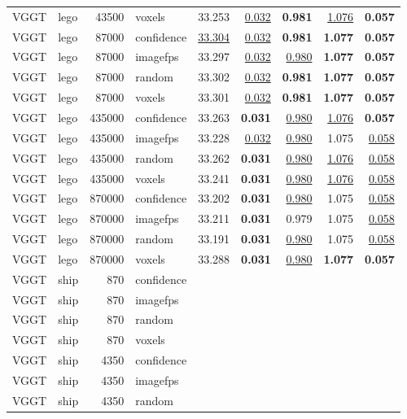 \begin{table}[H]
\begin{tabular}{llrlrrrrr}
VGGT & lego & 43500 & voxels & 33.253 & \underline{0.032} & \textbf{0.981} & \underline{1.076} & \textbf{0.057} \\
VGGT & lego & 87000 & confidence & \underline{33.304} & \underline{0.032} & \textbf{0.981} & \textbf{1.077} & \textbf{0.057} \\
VGGT & lego & 87000 & imagefps & 33.297 & \underline{0.032} & \underline{0.980} & \textbf{1.077} & \textbf{0.057} \\
VGGT & lego & 87000 & random & 33.302 & \underline{0.032} & \textbf{0.981} & \textbf{1.077} & \textbf{0.057} \\
VGGT & lego & 87000 & voxels & 33.301 & \underline{0.032} & \textbf{0.981} & \textbf{1.077} & \textbf{0.057} \\
VGGT & lego & 435000 & confidence & 33.263 & \textbf{0.031} & \underline{0.980} & \underline{1.076} & \textbf{0.057} \\
VGGT & lego & 435000 & imagefps & 33.228 & \underline{0.032} & \underline{0.980} & 1.075 & \underline{0.058} \\
VGGT & lego & 435000 & random & 33.262 & \textbf{0.031} & \underline{0.980} & \underline{1.076} & \underline{0.058} \\
VGGT & lego & 435000 & voxels & 33.241 & \textbf{0.031} & \underline{0.980} & \underline{1.076} & \underline{0.058} \\
VGGT & lego & 870000 & confidence & 33.202 & \textbf{0.031} & \underline{0.980} & 1.075 & \underline{0.058} \\
VGGT & lego & 870000 & imagefps & 33.211 & \textbf{0.031} & 0.979 & 1.075 & \underline{0.058} \\
VGGT & lego & 870000 & random & 33.191 & \textbf{0.031} & \underline{0.980} & 1.075 & \underline{0.058} \\
VGGT & lego & 870000 & voxels & 33.288 & \textbf{0.031} & \underline{0.980} & \textbf{1.077} & \textbf{0.057} \\
\midrule
VGGT & ship & 870 & confidence &  &  &  &  &  \\
VGGT & ship & 870 & imagefps &  &  &  &  &  \\
VGGT & ship & 870 & random &  &  &  &  &  \\
VGGT & ship & 870 & voxels &  &  &  &  &  \\
VGGT & ship & 4350 & confidence &  &  &  &  &  \\
VGGT & ship & 4350 & imagefps &  &  &  &  &  \\
VGGT & ship & 4350 & random &  &  &  &  &  \\

\end{tabular}
\end{table}
